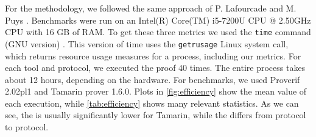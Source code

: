 For the methodology, we followed the same approach of P. Lafourcade and M. Puys \cite{lafourcade:hal-01306395}. Benchmarks were run on an Intel(R) Core(TM) i5-7200U CPU @ 2.50GHz CPU with 16 GB of RAM. To get these three metrics we used the \lstinline{time} command (GNU version) \cite{time_command}. This version of time uses the \lstinline{getrusage} Linux system call, which returns resource usage measures for a process, including our metrics. For each tool and protocol, we executed the proof 40 times. The entire process takes about 12 hours, depending on the hardware. For benchmarks, we used Proverif 2.02pl1 and Tamarin prover 1.6.0. Plots in \cref{fig:efficiency} show the mean value of each execution, while \cref{tab:efficiency} shows many relevant statistics. As we can see, the \mrss{} is usually significantly lower for Tamarin, while the \wct{} differs from protocol to protocol.

